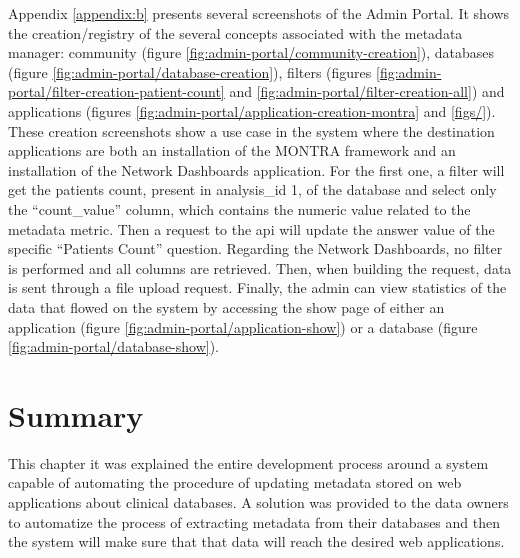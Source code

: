 Appendix \ref{appendix:b} presents several screenshots of the Admin Portal.
It shows the creation/registry of the several concepts associated with the metadata manager: community (figure \ref{fig:admin-portal/community-creation}), databases (figure \ref{fig:admin-portal/database-creation}), filters (figures \ref{fig:admin-portal/filter-creation-patient-count} and \ref{fig:admin-portal/filter-creation-all}) and applications (figures \ref{fig:admin-portal/application-creation-montra} and \ref{figs/}).
These creation screenshots show a use case in the system where the destination applications are both an installation of the MONTRA framework and an installation of the Network Dashboards application.
For the first one, a filter will get the patients count, present in analysis\_id 1, of the database and select only the ``count\_value'' column, which contains the numeric value related to the metadata metric.
Then a request to the \gls{api} will update the answer value of the specific ``Patients Count'' question.
Regarding the Network Dashboards, no filter is performed and all columns are retrieved.
Then, when building the request, data is sent through a file upload request.
Finally, the admin can view statistics of the data that flowed on the system by accessing the show page of either an application (figure \ref{fig:admin-portal/application-show}) or a database (figure \ref{fig:admin-portal/database-show}).

\section{Summary}

This chapter it was explained the entire development process around a system capable of automating the procedure of updating metadata stored on web applications about clinical databases.
A solution was provided to the data owners to automatize the process of extracting metadata from their databases and then the system will make sure that that data will reach the desired web applications.

